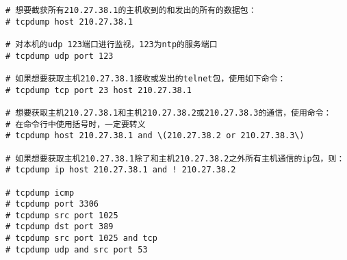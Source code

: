 \small{
\begin{verbatim}
# 想要截获所有210.27.38.1的主机收到的和发出的所有的数据包：
# tcpdump host 210.27.38.1

# 对本机的udp 123端口进行监视，123为ntp的服务端口
# tcpdump udp port 123

# 如果想要获取主机210.27.38.1接收或发出的telnet包，使用如下命令：
# tcpdump tcp port 23 host 210.27.38.1

# 想要获取主机210.27.38.1和主机210.27.38.2或210.27.38.3的通信，使用命令：
# 在命令行中使用括号时，一定要转义
# tcpdump host 210.27.38.1 and \(210.27.38.2 or 210.27.38.3\)

# 如果想要获取主机210.27.38.1除了和主机210.27.38.2之外所有主机通信的ip包，则：
# tcpdump ip host 210.27.38.1 and ! 210.27.38.2

# tcpdump icmp
# tcpdump port 3306
# tcpdump src port 1025
# tcpdump dst port 389
# tcpdump src port 1025 and tcp
# tcpdump udp and src port 53
\end{verbatim}
}
\normalsize
